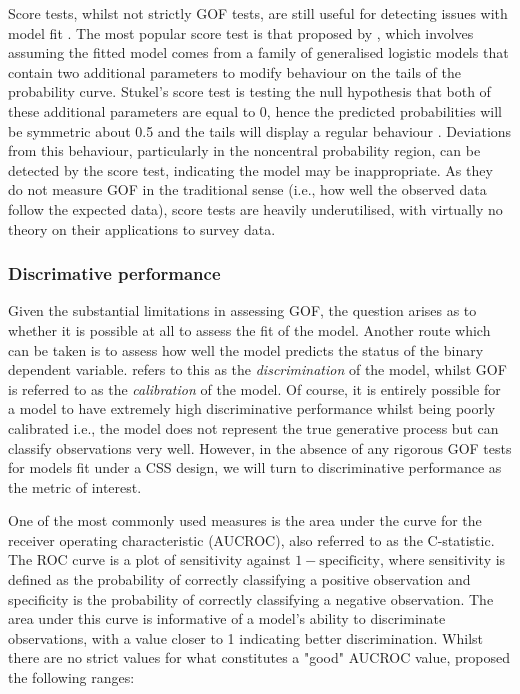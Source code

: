 Score tests, whilst not strictly GOF tests, are still useful for detecting issues with model fit \citep{hosmer1997}. The most popular score test is that proposed by \citet{stukel1988}, which involves assuming the fitted model comes from a family of generalised logistic models that contain two additional parameters to modify behaviour on the tails of the probability curve. Stukel's score test is testing the null hypothesis that both of these additional parameters are equal to 0, hence the predicted probabilities will be symmetric about 0.5 and the tails will display a regular behaviour \citep{liu2007}. Deviations from this behaviour, particularly in the noncentral probability region, can be detected by the score test, indicating the model may be inappropriate. As they do not measure GOF in the traditional sense (i.e., how well the observed data follow the expected data), score tests are heavily underutilised, with virtually no theory on their applications to survey data.

\subsubsection{Discrimative performance}

Given the substantial limitations in assessing GOF, the question arises as to whether it is possible at all to assess the fit of the model. Another route which can be taken is to assess how well the model predicts the status of the binary dependent variable. \citet{hosmer2000} refers to this as the \emph{discrimination} of the model, whilst GOF is referred to as the \emph{calibration} of the model. Of course, it is entirely possible for a model to have extremely high discriminative performance whilst being poorly calibrated i.e., the model does not represent the true generative process but can classify observations very well. However, in the absence of any rigorous GOF tests for models fit under a CSS design, we will turn to discriminative performance as the metric of interest.

One of the most commonly used measures is the area under the curve for the receiver operating characteristic (AUCROC), also referred to as the C-statistic. The ROC curve is a plot of sensitivity against $1 - \text{specificity}$, where sensitivity is defined as the probability of correctly classifying a positive observation and specificity is the probability of correctly classifying a negative observation. The area under this curve is informative of a model's ability to discriminate observations, with a value closer to 1 indicating better discrimination. Whilst there are no strict values for what constitutes a "good" AUCROC value, \citet{hosmer2000} proposed the following ranges:

